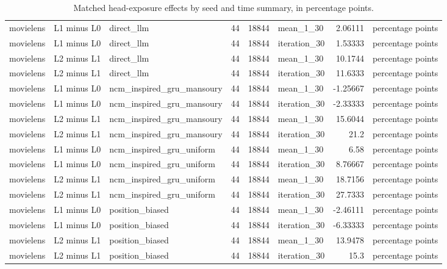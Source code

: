 \begin{table}[htbp!]
\begin{tabular}{lllrrlrl}
movielens & L1 minus L0 & direct\_llm & 44 & 18844 & mean\_1\_30 & 2.06111 & percentage points \\
movielens & L1 minus L0 & direct\_llm & 44 & 18844 & iteration\_30 & 1.53333 & percentage points \\
movielens & L2 minus L1 & direct\_llm & 44 & 18844 & mean\_1\_30 & 10.1744 & percentage points \\
movielens & L2 minus L1 & direct\_llm & 44 & 18844 & iteration\_30 & 11.6333 & percentage points \\
movielens & L1 minus L0 & ncm\_inspired\_gru\_mansoury & 44 & 18844 & mean\_1\_30 & -1.25667 & percentage points \\
movielens & L1 minus L0 & ncm\_inspired\_gru\_mansoury & 44 & 18844 & iteration\_30 & -2.33333 & percentage points \\
movielens & L2 minus L1 & ncm\_inspired\_gru\_mansoury & 44 & 18844 & mean\_1\_30 & 15.6044 & percentage points \\
movielens & L2 minus L1 & ncm\_inspired\_gru\_mansoury & 44 & 18844 & iteration\_30 & 21.2 & percentage points \\
movielens & L1 minus L0 & ncm\_inspired\_gru\_uniform & 44 & 18844 & mean\_1\_30 & 6.58 & percentage points \\
movielens & L1 minus L0 & ncm\_inspired\_gru\_uniform & 44 & 18844 & iteration\_30 & 8.76667 & percentage points \\
movielens & L2 minus L1 & ncm\_inspired\_gru\_uniform & 44 & 18844 & mean\_1\_30 & 18.7156 & percentage points \\
movielens & L2 minus L1 & ncm\_inspired\_gru\_uniform & 44 & 18844 & iteration\_30 & 27.7333 & percentage points \\
movielens & L1 minus L0 & position\_biased & 44 & 18844 & mean\_1\_30 & -2.46111 & percentage points \\
movielens & L1 minus L0 & position\_biased & 44 & 18844 & iteration\_30 & -6.33333 & percentage points \\
movielens & L2 minus L1 & position\_biased & 44 & 18844 & mean\_1\_30 & 13.9478 & percentage points \\
movielens & L2 minus L1 & position\_biased & 44 & 18844 & iteration\_30 & 15.3 & percentage points \\
\hline
\end{tabular}
\caption{Matched head-exposure effects by seed and time summary, in percentage points.}
\label{chap:results:tab:rq1_feedback_head_exposure}
\end{table}
